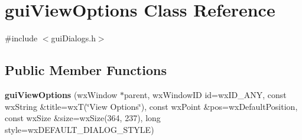 \hypertarget{classgui_view_options}{
\section{guiViewOptions Class Reference}
\label{classgui_view_options}
}


{\ttfamily \#include $<$guiDialogs.h$>$}\subsection*{Public Member Functions}
\begin{DoxyCompactItemize}
\item 
\hypertarget{classgui_view_options_aea529632d6b19e17ed8900575070171d}{
{\bfseries guiViewOptions} (wxWindow $\ast$parent, wxWindowID id=wxID\_\-ANY, const wxString \&title=wxT(\char`\"{}View Options\char`\"{}), const wxPoint \&pos=wxDefaultPosition, const wxSize \&size=wxSize(364, 237), long style=wxDEFAULT\_\-DIALOG\_\-STYLE)}
\label{classgui_view_options_aea529632d6b19e17ed8900575070171d}

\end{DoxyCompactItemize}
